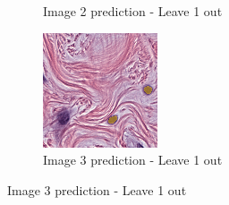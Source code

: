 \begin{figure}[H]
\begin{subfigure}[b]{0.32\textwidth}
    \caption{Image 2 prediction - Leave 1 out}
  \end{subfigure}\hfill
  \begin{subfigure}[b]{0.32\textwidth}
    \centering
    \includegraphics[width=\linewidth]{assets/images/for_presentation/exp3-3-pred-l1o.png}
    \caption{Image 3 prediction - Leave 1 out}
  \end{subfigure}

  \par\vspace{0.5em}


\end{figure}
